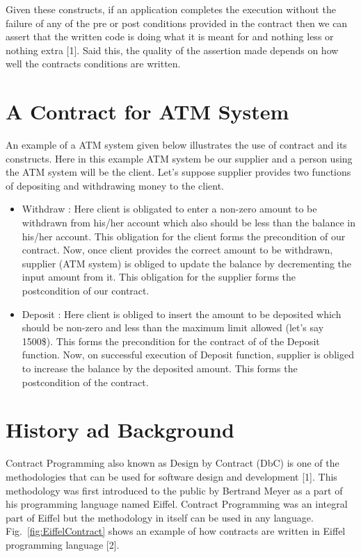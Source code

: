 Given these constructs, if an application completes the execution without the failure of any of the pre or post conditions provided in the contract then we can assert that the written code is doing what it is meant for and nothing less or nothing extra [1].
Said this, the quality of the assertion made depends on how well the contracts conditions are written. 

\section{A Contract for ATM System}

An example of a ATM system given below illustrates the use of contract and its constructs.
Here in this example ATM system be our supplier and a person using the ATM system will be the client. Let's suppose supplier provides two functions of depositing and withdrawing money to the client.
\begin{itemize}
\item Withdraw :
Here client is obligated to enter a non-zero amount to be withdrawn from his/her account which also should be less than the balance in his/her account. This obligation for the client forms the precondition of our contract.
Now, once client provides the correct amount to be withdrawn, supplier (ATM system) is obliged to update the balance by decrementing the input amount from it. This obligation for the supplier forms the postcondition of our contract.

\item Deposit :
Here client is obliged to insert the amount to be deposited which should be non-zero and less than the maximum limit allowed (let's say 1500\$). This forms the precondition for the contract of of the Deposit function.
Now, on successful execution of Deposit function, supplier is obliged to increase the balance by the deposited amount. This forms the postcondition of the contract.  
      
\end{itemize}

\section{History ad Background}

Contract Programming also known as Design by Contract (DbC) is one of the methodologies that can be used for software design and development [1]. This methodology was first introduced to the public by Bertrand Meyer as a part of his programming language named Eiffel. Contract Programming was an integral part of Eiffel but the methodology in itself can be used in any language. Fig.~\ref{fig:EiffelContract} shows an example of how contracts are written in Eiffel programming language [2].

